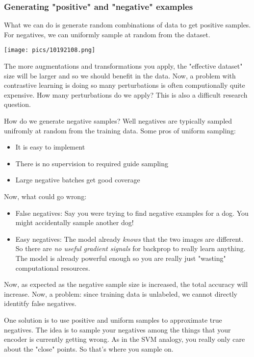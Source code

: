\documentclass[11pt]{scrartcl}
\begin{document}
\subsubsection{Generating "positive" and "negative" examples}
What we can do is generate random combinations of data  to get positive samples. For negatives, we can uniformly sample at random from the dataset. 
\begin{center}
    \texttt{[image: pics/10192108.png]}
\end{center}
The more augmentations and transformations you apply, the "effective dataset" size will be larger and so we should benefit in the data. Now, a problem with contrastive learning is doing so many perturbations is often computionally quite expensive. How many perturbations do we apply? This is also a difficult research question.

How do we generate negative samples? Well negatives are typically sampled unifromly at random from the training data. Some pros of uniform sampling:
\begin{itemize}
    \item It is easy to implement
    \item There is no supervision to required guide sampling
    \item Large negative batches get good coverage
\end{itemize}

Now, what could go wrong:
\begin{itemize}
    \item False negatives: Say you were trying to find negative examples for a dog. You might accidentally sample another dog! 
    \item Easy negatives: The model already \textit{knows} that the two images are different. So there are \textit{no useful gradient signals} for backprop to really learn anything. The model is already powerful enough so you are really just "wasting" computational resources. 
\end{itemize}
Now, as expected as the negative sample size is increased, the total accuracy will increase. Now, a problem: since training data is unlabeled, we cannot directly identitfy false negatives. 

One solution is to use positive and uniform samples to approximate true negatives. The idea is to sample your negatives among the things that your encoder is currently getting wrong. As in the SVM analogy, you really only care about the "close" points. So that's where you sample on.
\end{document}
